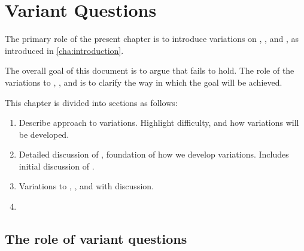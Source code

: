 \chapter{Variant Questions}
\label{cha:var}

\begin{note}
  The primary role of the present chapter is to introduce variations on \qWhy{}, \qHow{}, and \issueInclusion{}, as introduced in \autoref{cha:introduction}.

  The overall goal of this document is to argue that \issueInclusion{} fails to hold.
  The role of the variations to \qWhy{}, \qHow{}, and \issueInclusion{} is to clarify the way in which the goal will be achieved.
\end{note}

\begin{note}
  This chapter is divided into sections as follows:
  \begin{enumerate}[label=, leftmargin=*]
  \item

    Describe approach to variations.
    Highlight difficulty, and how variations will be developed.
  \item

    Detailed discussion of , foundation of how we develop variations.
    Includes initial discussion of .
  \item

    Variations to \qWhy{}, \qHow{}, and \issueInclusion{} with discussion.
  \item

  \end{enumerate}
\end{note}

\section{The role of variant questions}
\label{cha:var:sec:wiggling}


